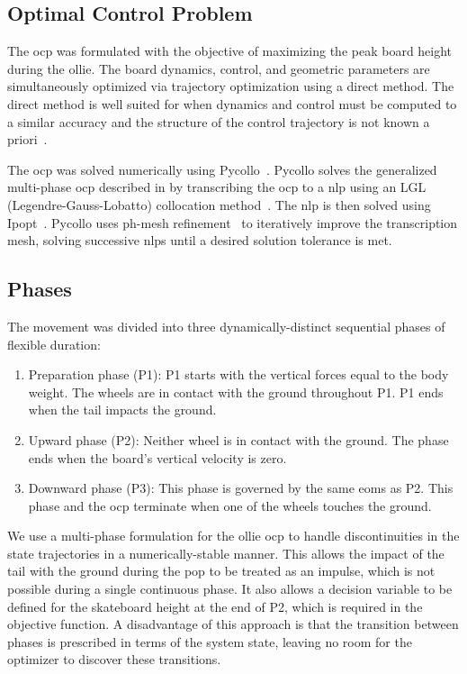 \documentclass[default,iicol,pdflatex]{sn-jnl}
\begin{document}
\subsection{Optimal Control Problem} \label{sec:ocp}
The \gls{ocp} was formulated with the objective of maximizing the peak board height during the ollie. The board dynamics, control, and geometric parameters are simultaneously optimized via trajectory optimization using a direct method.
The direct method is well suited for when dynamics and control must be computed to a similar accuracy and the structure of the control trajectory is not known a priori~\cite{kelly_introduction_2017}.

The \gls{ocp} was solved numerically using Pycollo~\cite{brockie_predictive_2021}. Pycollo solves the generalized multi-phase \gls{ocp} described in \citet{betts_practical_2010} by transcribing the \gls{ocp} to a \gls{nlp} using an LGL (Legendre-Gauss-Lobatto) collocation method~\cite{betts_using_2016}. The \gls{nlp} is then solved using Ipopt~\cite{biegler_large-scale_2009}. Pycollo uses ph-mesh refinement~\cite{patterson_ph_2015} to iteratively improve the transcription mesh, solving successive \glspl{nlp} until a desired solution tolerance is met.

\subsection{Phases} \label{s_phases}

The movement was divided into three dynamically-distinct sequential phases of flexible duration:
\begin{enumerate} \label{n_phases}
  \item Preparation phase (P1): P1 starts with the vertical forces equal to the body weight. The wheels are in contact with the ground throughout P1. P1 ends when the tail impacts the ground.
  \item Upward phase (P2): Neither wheel is in contact with the ground. The phase ends when the board's vertical velocity is zero.
  \item Downward phase (P3): This phase is governed by the same \glspl{eom} as P2. This phase and the \gls{ocp} terminate when one of the wheels touches the ground.
\end{enumerate}

We use a multi-phase formulation for the ollie \gls{ocp} to handle discontinuities in the state trajectories in a numerically-stable manner. This allows the impact of the tail with the ground during the pop to be treated as an impulse, which is not possible during a single continuous phase. It also allows a decision variable to be defined for the skateboard height at the end of P2, which is required in the objective function. A disadvantage of this approach is that the transition between phases is prescribed in terms of the system state, leaving no room for the optimizer to discover these transitions.
\end{document}
